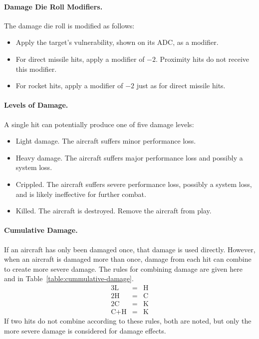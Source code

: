 {\paragraph{Damage Die Roll Modifiers.} The damage die roll is modified as follows:

\begin{itemize}

    \item Apply the target's vulnerability, shown on its ADC, as a modifier.
    
    \item For direct missile hits, apply a modifier of $-2$. Proximity hits do not receive this modifier.    
    
    \item For rocket hits, apply a modifier of $-2$ just as for direct missile hits.
    
\end{itemize}

\paragraph{Levels of Damage.} A single hit can potentially produce one of five damage levels:

\begin{itemize}

    \item{} Light damage. The aircraft suffers minor performance loss.

    \item{} Heavy damage. The aircraft suffers major performance loss and possibly a system loss.

    \item{} Crippled. The aircraft suffers severe performance loss, possibly a system loss, and is likely ineffective for further combat.
    
    \item{} Killed. The aircraft is destroyed. Remove the aircraft from play.

\end{itemize}



\paragraph{Cumulative Damage.} 
If an aircraft has only been damaged once, that damage is used directly. However, when an aircraft is damaged more than once,
damage from each hit can combine to create more severe damage. The rules for combining damage are given here and in Table~\ref{table:cummulative-damage}.
\begin{eqnarray*}
3\textrm{L}&=&\textrm{H}\\
2\textrm{H}&=&\textrm{C}\\
2\textrm{C}&=&\textrm{K}\\
\textrm{C} + \textrm{H}&=&\textrm{K}
\end{eqnarray*}
If two hits do not combine according to these rules, both are noted, but only the more severe damage is considered for damage effects.

}
